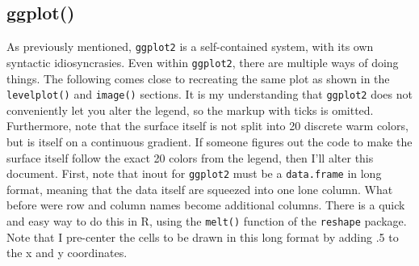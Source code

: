 \documentclass[a4paper]{article}
\begin{document}
\subsection{ggplot()}
As previously mentioned, \texttt{ggplot2} is a self-contained system, with its own syntactic idiosyncrasies. Even within \texttt{ggplot2}, there are multiple ways of doing things. The following comes close to recreating the same plot as shown in the \texttt{levelplot()} and \texttt{image()} sections. It is my understanding that \texttt{ggplot2} does not conveniently let you alter the legend, so the markup with ticks is omitted. Furthermore, note that the surface itself is not split into 20 discrete warm colors, but is itself on a continuous gradient. If someone figures out the code to make the surface itself follow the exact 20 colors from the legend, then I'll alter this document. First, note that inout for \texttt{ggplot2} must be a \texttt{data.frame} in long format, meaning that the data itself are squeezed into one lone column. What before were row and column names become additional columns. There is a quick and easy way to do this in R, using the \texttt{melt()} function of the \texttt{reshape} package. Note that I pre-center the cells to be drawn in this long format by adding .5 to the x and y coordinates.

\end{document}
